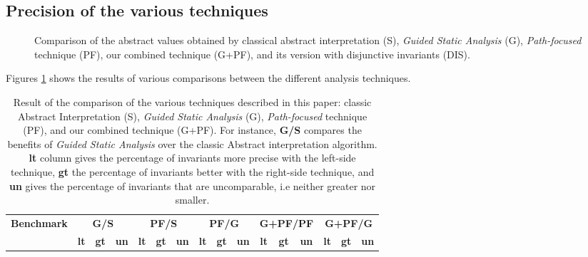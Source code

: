 \documentclass[preprint]{sigplanconf}
\begin{document}
\subsection{Precision of the various techniques}

\begin{figure}[h]
  \begin{center}
    
  \end{center} 
  \vspace{-20px}
  \caption{Comparison of the abstract values obtained by classical abstract
  interpretation (S), \emph{Guided Static
  Analysis} (G), \emph{Path-focused} technique (PF), our combined technique
  (G+PF), and its version with disjunctive invariants (DIS).}
  \label{fig:techniques}
\end {figure}

Figures \ref{fig:techniques} shows the results of various comparisons between
the different analysis techniques.

\begin{table*}
\begin{center}
\begin{tabular}{|l||c|c|c||c|c|c||c|c|c||c|c|c||c|c|c||} \hline
\textbf{Benchmark} & \multicolumn{3}{c||}{\textbf{G/S}}
& \multicolumn{3}{c||}{\textbf{PF/S}}
& \multicolumn{3}{c||}{\textbf{PF/G}}
& \multicolumn{3}{c||}{\textbf{G+PF/PF}}
& \multicolumn{3}{c||}{\textbf{G+PF/G}} \\ \cline{2-16}
& \textbf{lt} & \textbf{gt} & \textbf{un} 
& \textbf{lt} & \textbf{gt} & \textbf{un} 
& \textbf{lt} & \textbf{gt} & \textbf{un} 
& \textbf{lt} & \textbf{gt} & \textbf{un} 
& \textbf{lt} & \textbf{gt} & \textbf{un} \\
 \hline
 
\end{tabular}
\end{center}
\caption{Result of the comparison of the various techniques described in this
paper: classic Abstract Interpretation (S), \emph{Guided Static Analysis} (G),
\emph{Path-focused} technique (PF), and our combined technique (G+PF). For
instance, \textbf{G/S} compares the benefits of \emph{Guided Static Analysis}
over the classic Abstract interpretation algorithm. \textbf{lt} column gives the
percentage of invariants more precise with the left-side technique,
\textbf{gt} the percentage of invariants better with the right-side technique,
and \textbf{un} gives the percentage of invariants that are uncomparable, i.e
neither greater nor smaller.}
\end{table*}
\end{document}
